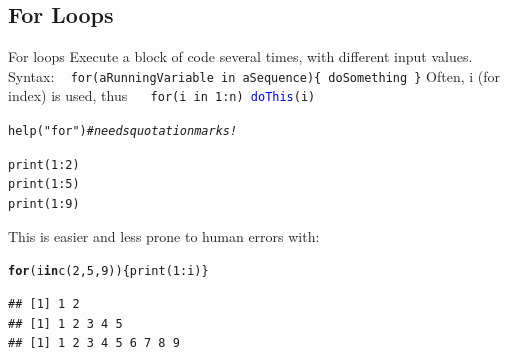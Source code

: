 \documentclass[xcolor=table,           xcolor=dvipsnames]{beamer}\usepackage[]{graphicx}\usepackage[]{color}
\makeatletter
\newcommand{\hlnum}[1]{\textcolor[rgb]{0,0,0}{#1}}
\newcommand{\hlstr}[1]{\textcolor[rgb]{0.545,0.137,0.137}{#1}}
\newcommand{\hlcom}[1]{\textcolor[rgb]{0,0.392,0}{\textit{#1}}}
\newcommand{\hlopt}[1]{\textcolor[rgb]{0,0,0}{#1}}
\newcommand{\hlstd}[1]{\textcolor[rgb]{0,0,0}{#1}}
\newcommand{\hlkwa}[1]{\textcolor[rgb]{1,0,0}{\textbf{#1}}}
\newcommand{\hlkwd}[1]{\textcolor[rgb]{0,0,1}{#1}}
\newenvironment{kframe}{%
 \def\at@end@of@kframe{}%
 \ifinner\ifhmode%
  \def\at@end@of@kframe{\end{minipage}}%
  \begin{minipage}{\columnwidth}%
 \fi\fi%
 \def\FrameCommand##1{\hskip\@totalleftmargin \hskip-\fboxsep
 \colorbox{shadecolor}{##1}\hskip-\fboxsep
     \hskip-\linewidth \hskip-\@totalleftmargin \hskip\columnwidth}%
 \MakeFramed {\advance\hsize-\width
   \@totalleftmargin\z@ \linewidth\hsize
   \@setminipage}}%
 {\par\unskip\endMakeFramed%
 \at@end@of@kframe}
\newenvironment{knitrout}{}{} %
\newcommand{\rcode}[1]{\texttt{\textcolor{Blue}{#1}}} %
\makeatother
\begin{document}
\subsection{For Loops}

\begin{frame}[fragile]{For loops}
Execute a block of code several times, with different input values.\\
Syntax: ~ \texttt{\alert{for}(aRunningVariable \alert{in} aSequence)\{ doSomething \}}
\pause
Often, i (for index) is used, thus ~~ \texttt{\alert{for}(i \alert{in} 1:n) \rcode{doThis}(i)}
\pause
\begin{knitrout}
\color{fgcolor}\begin{kframe}
\begin{alltt}
\hlkwd{help}\hlstd{(}\hlstr{"for"}\hlstd{)} \hlcom{# needs quotation marks!}
\end{alltt}
\end{kframe}
\end{knitrout}
\pause
\begin{knitrout}
\color{fgcolor}\begin{kframe}
\begin{alltt}
\hlkwd{print}\hlstd{(}\hlnum{1}\hlopt{:}\hlnum{2}\hlstd{)}
\hlkwd{print}\hlstd{(}\hlnum{1}\hlopt{:}\hlnum{5}\hlstd{)}
\hlkwd{print}\hlstd{(}\hlnum{1}\hlopt{:}\hlnum{9}\hlstd{)}
\end{alltt}
\end{kframe}
\end{knitrout}
\pause
This is easier and less prone to human errors with:
\pause
\begin{knitrout}
\color{fgcolor}\begin{kframe}
\begin{alltt}
\hlkwa{for}\hlstd{(i} \hlkwa{in} \hlkwd{c}\hlstd{(}\hlnum{2}\hlstd{,}\hlnum{5}\hlstd{,}\hlnum{9}\hlstd{) ) \{} \hlkwd{print}\hlstd{(}\hlnum{1}\hlopt{:}\hlstd{i) \}}
\end{alltt}
\begin{verbatim}
## [1] 1 2
## [1] 1 2 3 4 5
## [1] 1 2 3 4 5 6 7 8 9
\end{verbatim}
\end{kframe}
\end{knitrout}
\end{frame}
\end{document}
